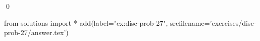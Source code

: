 
\begin{ex} 
  \label{ex:disc-prob-27}
  
  \qed
\end{ex} 
\begin{python0}
from solutions import *
add(label="ex:disc-prob-27",
    srcfilename='exercises/disc-prob-27/answer.tex') 
\end{python0}
